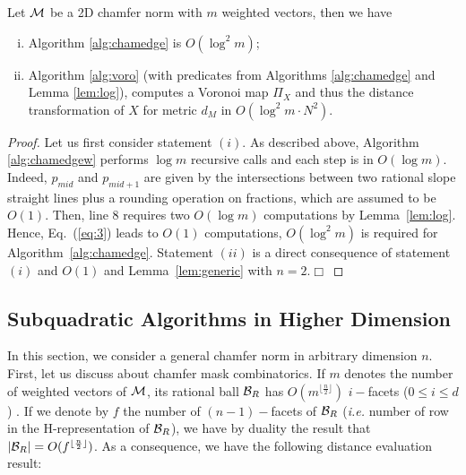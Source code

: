 \documentclass{llncs}
\begin{document}
\begin{theorem}
\label{them}
  Let $\mathcal{M}$ be a 2D chamfer norm with $m$ weighted vectors, then we
  have
  \begin{enumerate}[(i)]
  \item Algorithm     \ref{alg:chamedge} is   $O(\log^2{m})$\;;
  \item Algorithm \ref{alg:voro} (with predicates from Algorithms
    \ref{alg:chamedge} and Lemma \ref{lem:log}), computes a Voronoi
    map $\Pi_X$ and thus the distance transformation of $X$ for metric
    $d_{M}$ in   $ O( \log^2{m}\cdot N^2)$.
  \end{enumerate}
\end{theorem}
\begin{proof}
Let us first consider statement $(i)$. As described above, Algorithm
\ref{alg:chamedgew} performs $\log{m}$ recursive calls and each step
is in $O(\log{m})$. Indeed, $p_{mid}$ and $p_{mid+1}$ are given by the
intersections between two rational slope straight lines plus a
rounding operation on fractions, which are assumed to be $O(1)$. Then,
line 8 requires two $O(\log{m})$ computations by
Lemma~\ref{lem:log}. Hence, Eq.~(\ref{eq:3}) leads to $O(1)$
computations, $O(\log^2{m})$ is required for
Algorithm~\ref{alg:chamedge}.
Statement $(ii)$ is a direct consequence of statement $(i)$ and
$O(1)$ and Lemma~\ref{lem:generic} with $n=2$.$\Box$
\end{proof}


\subsection{Subquadratic Algorithms in Higher Dimension}
\label{sec:subq-algor-high}
In this section, we consider a general chamfer norm in arbitrary
dimension $n$.  First, let us discuss about chamfer mask
combinatorics. If $m$ denotes the number of weighted vectors of $\mathcal{M}$,
its rational ball $\mathcal{B}_R$ has $O(m^{\lfloor \frac{n}{2}\rfloor})$
$i-$facets ($0 \leq i \leq d$) \cite{deberg}. If we denote by $f$ the
number of $(n-1)-$facets of $\mathcal{B}_R$ (\emph{i.e.} number of row in the
H-representation of $\mathcal{B}_R$), we have by duality the result that $|\mathcal{B}_R| =
O(f^{\lfloor \frac{n}{2}\rfloor})$. As a consequence, we have the
following distance evaluation result:
\end{document}

